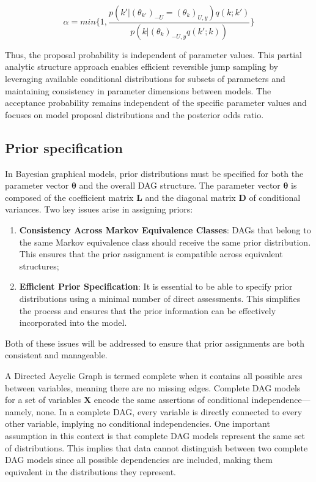 \documentclass{report}
\begin{document}
\begin{equation}
	\alpha = min \biggl \{ 1, \frac{p(k' | (\theta_{k'})_{-U} = (\theta_k)_{U,y})q(k;k')}{p(k|(\theta_k)_{-U,y}q(k';k))} \biggr \}
\end{equation}  

Thus, the proposal probability is independent of parameter values. 
This partial analytic structure approach enables efficient reversible jump sampling by leveraging available conditional distributions for subsets of parameters and maintaining consistency in parameter dimensions between models. The acceptance probability remains independent of the specific parameter values and focuses on model proposal distributions and the posterior odds ratio.

\subsection{Prior specification}

In Bayesian graphical models, prior distributions must be specified for both the parameter vector $\mathbf{\theta}$ and the overall DAG structure. The parameter vector $\mathbf{\theta}$ is composed of the coefficient matrix $\mathbf{L}$ and the diagonal matrix $\mathbf{D}$ of conditional variances.
Two key issues arise in assigning priors:

\begin{enumerate}
	\item \textbf{Consistency Across Markov Equivalence Classes}:  DAGs that belong to the same Markov equivalence class should receive the same prior distribution. This ensures that the prior assignment is compatible across equivalent structures;
	\item \textbf{Efficient Prior Specification}: It is essential to be able to specify prior distributions using a minimal number of direct assessments. This simplifies the process and ensures that the prior information can be effectively incorporated into the model. 
\end{enumerate}

Both of these issues will be addressed to ensure that prior assignments are both consistent and manageable.

A Directed Acyclic Graph is termed complete when it contains all possible arcs between variables, meaning there are no missing edges. 
Complete DAG models for a set of variables $\mathbf{X}$ encode the same assertions of conditional independence—namely, none. In a complete DAG, every variable is directly connected to every other variable, implying no conditional independencies.
One important assumption in this context is that complete DAG models represent the same set of distributions. This implies that data cannot distinguish between two complete DAG models since all possible dependencies are included, making them equivalent in the distributions they represent. 
\end{document}
